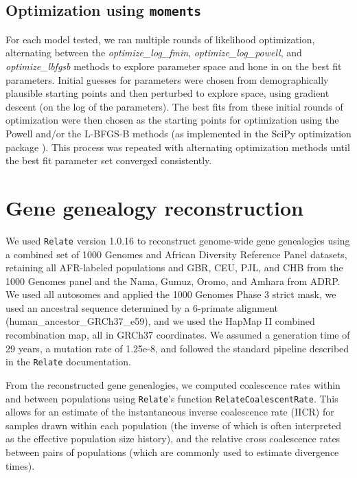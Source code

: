 \documentclass[]{article}
\newcommand{\moments}{\texttt{moments}\xspace}
\newcommand{\Relate}{\texttt{Relate}\xspace}
\begin{document}
\subsection{Optimization using \moments}
\label{sec:optimization}

For each model tested, we ran multiple rounds of likelihood optimization, 
alternating between the \emph{optimize\_log\_fmin},
\emph{optimize\_log\_powell}, and \emph{optimize\_lbfgsb} methods to explore
parameter space and hone in on the best fit parameters. Initial guesses for
parameters were chosen from demographically plausible starting points and then
perturbed to explore space, using gradient descent (on the log of the
parameters). The best fits from these initial rounds of optimization were then
chosen as the starting points for optimization using the Powell and/or the
L-BFGS-B methods (as implemented in the SciPy optimization package
\citep{Virtanen2020-kr}). This process was repeated with alternating
optimization methods until the best fit parameter set converged consistently.



\section{Gene genealogy reconstruction}
\label{sec:relate}

We used \Relate version 1.0.16 \citep{Speidel2019-nj} to reconstruct genome-wide
gene genealogies using a combined set of 1000 Genomes and African Diversity
Reference Panel datasets, retaining all AFR-labeled populations and GBR, CEU,
PJL, and CHB from the 1000 Genomes panel and the Nama, Gumuz, Oromo, and Amhara
from ADRP. We used all autosomes and applied the 1000 Genomes Phase 3 strict
mask, we used an ancestral sequence determined by a 6-primate alignment
(human\_ancestor\_GRCh37\_e59), and we used the HapMap II combined
recombination map, all in GRCh37 coordinates. We assumed a generation time of
29 years, a mutation rate of 1.25e-8, and followed the standard pipeline
described in the \Relate documentation.

From the reconstructed gene genealogies, we computed coalescence rates within
and between populations using \texttt{Relate}’s function \texttt{RelateCoalescentRate}.
This allows for an estimate of the instantaneous inverse coalescence rate
(IICR) for samples drawn within each population (the inverse of which is often
interpreted as the effective population size history), and the relative cross
coalescence rates between pairs of populations (which are commonly used to
estimate divergence times).
\end{document}
